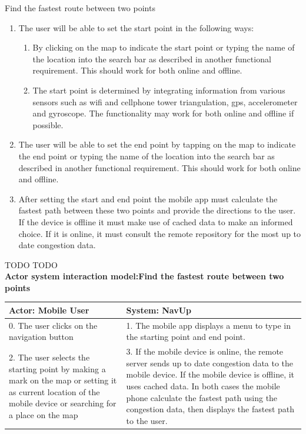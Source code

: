 \FuncReq
{Find the fastest route between two points}%
{
  \begin{enumerate}
    \item The user will be able to set the start point in the following ways:
      \begin{enumerate}
        \item By clicking on the map to indicate the start point or typing the name of the location into the search bar as described in another functional requirement. This should work for both online and offline.
        \item The start point is determined by integrating information from various sensors such as wifi and cellphone tower triangulation, gps, accelerometer and gyroscope. The functionality may work for both online and offline if possible.
      \end{enumerate}

    \item The user will be able to set the end point by tapping on the map to indicate the end point or typing the name of the location into the search bar as described in another functional requirement. This should work for both online and offline.
    \item After setting the start and end point the mobile app must calculate the fastest path between these two points and provide the directions to the user. If the device is offline it must make use of cached data to make an informed choice. If it is online, it must consult the remote repository for the most up to date congestion data.
  \end{enumerate}
  \mbox{}%
}
{TODO}
{TODO}
    \\
    \textbf{Actor system interaction model:Find the fastest route between two points }\\
    \begin{tabular}{ | p{6cm} | p{6cm} |}
    \hline
    Actor: Mobile User & System: NavUp \\ \hline
    0. The user clicks on the navigation button & 1. The mobile app displays a menu to type in the starting point and end point.\\ \hline
    2. The user selects the starting point by making a mark on the map or setting it as current location of the mobile device or searching for a place on the map & 3. If the mobile device is online, the remote server sends up to date congestion data to the mobile device. If the mobile device is offline, it uses cached data. In both cases the mobile phone calculate the fastest path using the congestion data, then displays the fastest path to the user.\\ \hline
    \end{tabular}
\\
\bigskip

